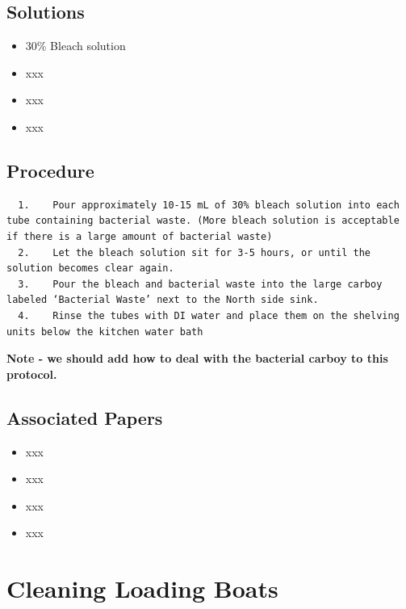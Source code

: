 \documentclass[
  letterpaper,
  DIV=11,
  numbers=noendperiod]{scrreprt}
\providecommand{\tightlist}{%
  \setlength{\itemsep}{0pt}\setlength{\parskip}{0pt}}\usepackage{longtable,booktabs,array}
\begin{document}
\hypertarget{solutions-4}{%
\section{Solutions}\label{solutions-4}}

\begin{itemize}
\tightlist
\item
  30\% Bleach solution
\item
  xxx
\item
  xxx
\item
  xxx
\end{itemize}

\hypertarget{procedure-4}{%
\section{Procedure}\label{procedure-4}}

\begin{verbatim}
  1.    Pour approximately 10-15 mL of 30% bleach solution into each tube containing bacterial waste. (More bleach solution is acceptable if there is a large amount of bacterial waste)
  2.    Let the bleach solution sit for 3-5 hours, or until the solution becomes clear again.
  3.    Pour the bleach and bacterial waste into the large carboy labeled ‘Bacterial Waste’ next to the North side sink.
  4.    Rinse the tubes with DI water and place them on the shelving units below the kitchen water bath
\end{verbatim}

\textbf{Note - we should add how to deal with the bacterial carboy to
this protocol.}

\hypertarget{associated-papers-4}{%
\section{Associated Papers}\label{associated-papers-4}}

\begin{itemize}
\tightlist
\item
  xxx
\item
  xxx
\item
  xxx
\item
  xxx
\end{itemize}

\hypertarget{sec-general-clean_load_boats}{%
\chapter{Cleaning Loading Boats}\label{sec-general-clean_load_boats}}
\end{document}
